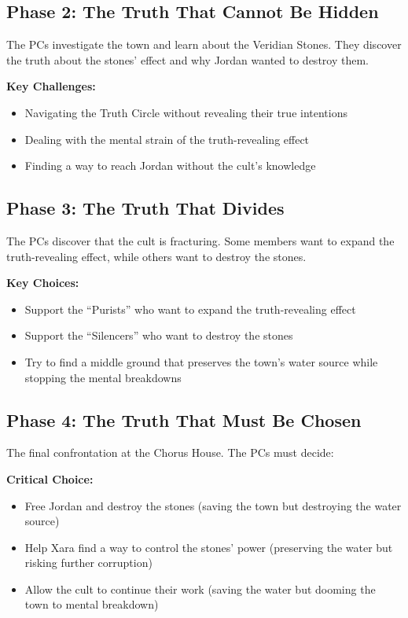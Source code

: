 \documentclass[11pt]{article}
\newcommand{\keypoint}[1]{\par\noindent\textbf{\textcolor{accentorange}{#1}}}
\begin{document}
\subsection{Phase 2: The Truth That Cannot Be Hidden}
The PCs investigate the town and learn about the Veridian Stones. They discover the truth about the stones' effect and why Jordan wanted to destroy them.

\keypoint{Key Challenges:}
\begin{itemize}[leftmargin=*]
    \item Navigating the Truth Circle without revealing their true intentions
    \item Dealing with the mental strain of the truth-revealing effect
    \item Finding a way to reach Jordan without the cult's knowledge
\end{itemize}

\subsection{Phase 3: The Truth That Divides}
The PCs discover that the cult is fracturing. Some members want to expand the truth-revealing effect, while others want to destroy the stones.

\keypoint{Key Choices:}
\begin{itemize}[leftmargin=*]
    \item Support the ``Purists'' who want to expand the truth-revealing effect
    \item Support the ``Silencers'' who want to destroy the stones
    \item Try to find a middle ground that preserves the town's water source while stopping the mental breakdowns
\end{itemize}

\subsection{Phase 4: The Truth That Must Be Chosen}
The final confrontation at the Chorus House. The PCs must decide:

\keypoint{Critical Choice:}
\begin{itemize}[leftmargin=*]
    \item Free Jordan and destroy the stones (saving the town but destroying the water source)
    \item Help Xara find a way to control the stones' power (preserving the water but risking further corruption)
    \item Allow the cult to continue their work (saving the water but dooming the town to mental breakdown)
\end{itemize}
\end{document}
